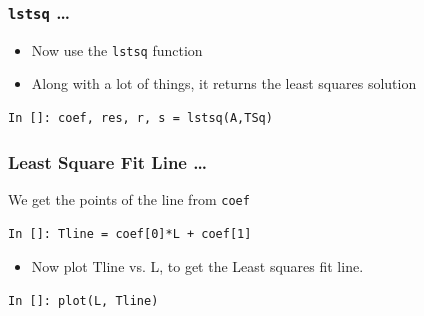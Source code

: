 \documentclass[14pt,compress]{beamer}
\newcommand{\typ}[1]{\lstinline{#1}}
\begin{document}
\begin{frame}[fragile]
\frametitle{\typ{lstsq} \ldots}
\begin{itemize}
\item Now use the \typ{lstsq} function
\item Along with a lot of things, it returns the least squares solution
\end{itemize}
\begin{lstlisting}
In []: coef, res, r, s = lstsq(A,TSq)
\end{lstlisting}
\end{frame}

\begin{frame}[fragile]
\frametitle{Least Square Fit Line \ldots}
We get the points of the line from \typ{coef}
\begin{lstlisting}
In []: Tline = coef[0]*L + coef[1]
\end{lstlisting}
\begin{itemize}
\item Now plot Tline vs. L, to get the Least squares fit line. 
\end{itemize}
\begin{lstlisting}
In []: plot(L, Tline)
\end{lstlisting}
\end{frame}
\end{document}
